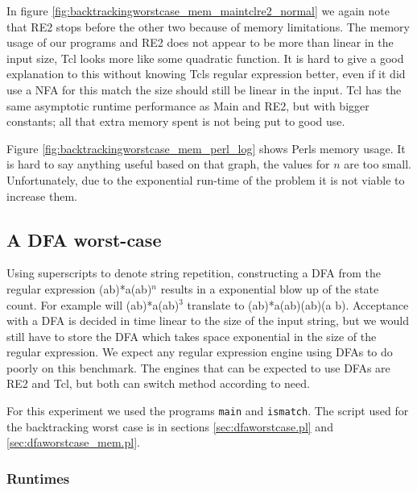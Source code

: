 In figure \vref{fig:backtrackingworstcase_mem_maintclre2_normal} we
again note that RE2 stops before the other two because of memory limitations. The memory usage of our programs and RE2 does not appear
to be more than linear in the input size, Tcl looks more like some
quadratic function. It is hard to give a good explanation to this
without knowing Tcls regular expression better, even if it did use a
NFA for this match the size should still be linear in the input. Tcl
has the same asymptotic runtime performance as Main and RE2, but with
bigger constants; all that extra memory spent is not being put to
good use. 

Figure \vref{fig:backtrackingworstcase_mem_perl_log} shows Perls
memory usage. It is hard to say anything useful based on that graph,
the values for $n$ are too small. Unfortunately, due to the exponential run-time of
the problem it is not viable to increase them.

\subsection{A DFA worst-case}

Using superscripts to denote string repetition, constructing a DFA
from the regular expression \textsf{(a\textbar b)*a(a\textbar b)$^n$}
results in a exponential blow up of the state count. For example will
\textsf{(a\textbar b)*a(a\textbar b)$^3$} translate to
\textsf{(a\textbar b)*a(a\textbar b)(a\textbar b)(a\textbar
  b)}. Acceptance with a DFA is decided in time linear to the size of
the input string, but we would still have to store the DFA which takes
space exponential in the size of the regular expression. We expect any
regular expression engine using DFAs to do poorly on this
benchmark. The engines that can be expected to use DFAs are RE2 and
Tcl, but both can switch method according to need. 


For this experiment we used the programs \texttt{main} and
\texttt{ismatch}. The script used for the backtracking worst case is
in sections \vref{sec:dfaworstcase.pl} and
\vref{sec:dfaworstcase_mem.pl}.


\subsubsection{Runtimes}

